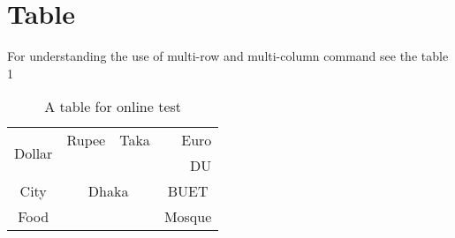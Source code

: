 \documentclass[14pt]{article}
\begin{document}
    \section{Table}
    For understanding the use of multi-row and multi-column command see the
    table 1
    \begin{table}[h]
        \centering
        \begin{tabular}{|c|c|c|c|}
        \hline
         \multirow{2}{*}{Dollar}&Rupee&Taka&\multicolumn{1}{r|}{Euro}\\
         \cline{2-4}
         & \multicolumn{2}{c}{\multirow{3}{*}{Dhaka}}&\multicolumn{1}{|r|}{DU}\\
         \cline{4-4}
         City&\multicolumn{2}{c}{}&\multicolumn{1}{c|}{BUET}\\
         \cline{1-1} \cline{4-4}
         Food&\multicolumn{2}{c}{}&\multicolumn{1}{|c|}{Mosque}\\
         \hline
        \end{tabular}
        \caption{ A table for online test}
    \end{table}
\end{document}
